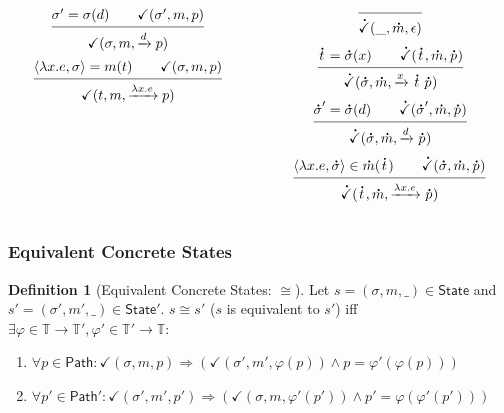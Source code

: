 \documentclass{beamer}
\theoremstyle{definition}
\newtheorem*{definition*}{Definition}
\newcommand*{\A}[1]{\overset{\,_{\mbox{\Large .}}}{#1}}
\newcommand*{\modid}{d}
\newcommand*{\Time}{\mathbb{T}}
\newcommand*{\ctx}{\sigma}
\newcommand*{\mem}{m}
\newcommand*{\State}{\mathsf{State}}
\newcommand*{\valid}{\checkmark}
\newcommand*{\Path}{\mathsf{Path}}
\newcommand*{\equivalent}{\cong}
\begin{document}
\begin{frame}[c]
\begin{columns}
\begin{column}{0.3\linewidth}
      \[
        \begin{prooftree}
          \hypo{\ctx'=\ctx(\modid)\qquad\valid(\ctx',\mem,p)}
          \infer1{\valid(\ctx,\mem,\xrightarrow{\modid}p)}
        \end{prooftree}
      \]
      \[
        \begin{prooftree}
          \hypo{\langle\lambda x.e,{\ctx}\rangle=\mem(t)\qquad\valid(\ctx,\mem,p)}
          \infer1{\valid(t,\mem,\xrightarrow{\lambda x.e}p)}
        \end{prooftree}
      \]
    \end{column}
    \begin{column}{0.3\linewidth}
      \scriptsize
      \[
        \begin{prooftree}
          \infer0{\A\valid(\_,\A\mem,\epsilon)}
        \end{prooftree}
      \]
      \[
        \begin{prooftree}
          \hypo{\A{t}=\A\ctx(x)\qquad\A\valid(\A{t},\A\mem,\A{p})}
          \infer1{\A\valid(\A\ctx,\A\mem,\xrightarrow{x}\A{t}\:\A{p})}
        \end{prooftree}
      \]
      \[
        \begin{prooftree}
          \hypo{\A\ctx'=\A\ctx(\modid)\qquad\A\valid(\A\ctx',\A\mem,\A{p})}
          \infer1{\A\valid(\A\ctx,\A\mem,\xrightarrow{\modid}\A{p})}
        \end{prooftree}
      \]
      \[
        \begin{prooftree}
          \hypo{\langle\lambda x.e,{\A\ctx}\rangle\in\A\mem(\A{t})\qquad\A\valid(\A\ctx,\A\mem,\A{p})}
          \infer1{\A\valid(\A{t},\A\mem,\xrightarrow{\lambda x.e}\A{p})}
        \end{prooftree}
      \]
    \end{column}
  \end{columns}
\end{frame}
\begin{frame}[c]
  \frametitle{Equivalent Concrete States}
  \begin{definition*}[Equivalent Concrete States: $\equivalent$]
    Let $s=(\ctx,\mem,\_)\in\State$ and $s'=(\ctx',\mem',\_)\in\State'$.
    $s\equivalent s'$ ($s$ is equivalent to $s'$) iff $\exists\varphi\in\Time\rightarrow\Time',\varphi'\in\Time'\rightarrow\Time:$
    \begin{enumerate}
      \item $\forall p\in\Path:\valid(\ctx,\mem,p)\Rightarrow(\valid(\ctx',\mem',\varphi(p))\land p=\varphi'(\varphi(p)))$
      \item $\forall p'\in\Path':\valid(\ctx',\mem',p')\Rightarrow(\valid(\ctx,\mem,\varphi'(p'))\land p'=\varphi(\varphi'(p')))$
    \end{enumerate}
  \end{definition*}
\end{frame}
\end{document}
